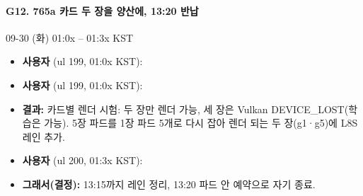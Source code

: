 \paragraph{G12. 765a 카드 두 장을 양산에, 13:20 반납}
{\small 09-30 (화) 01:0x -- 01:3x KST}
\begin{itemize}
  \item \textbf{사용자} (ul 199, 01:0x KST): 
  \item \textbf{사용자} (ul 199, 01:0x KST): 
  \item \textbf{결과:} 카드별 렌더 시험: 두 장만 렌더 가능, 세 장은 Vulkan DEVICE\_LOST(학습은 가능). 5장 파드를 1장 파드 5개로 다시 잡아 렌더 되는 두 장(g1·g5)에 L8S 레인 추가.
  \item \textbf{사용자} (ul 200, 01:3x KST): 
  \item \textbf{그래서(결정):} 13:15까지 레인 정리, 13:20 파드 안 예약으로 자기 종료.
\end{itemize}

